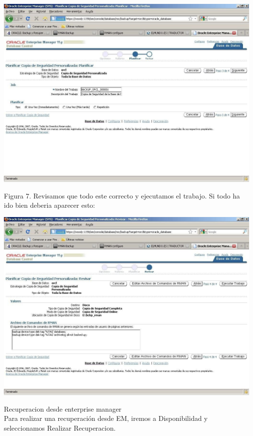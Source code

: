 \begin{enumerate}[1.]
\begin{center}
\includegraphics[width=15cm]{./Imagenes/eje3}
\end{center}
Figura 7. Revisamos que todo este correcto y ejecutamos el trabajo. Si todo ha ido bien deberia aparecer esto:
\begin{center}
\includegraphics[width=15cm]{./Imagenes/eje4}
\end{center}
Recuperacion desde enterprise manager
\\
Para realizar una recuperación desde EM, iremos a Disponibilidad y seleccionamos
Realizar Recuperacion.
\begin{center}

\end{center}
\end{enumerate}
